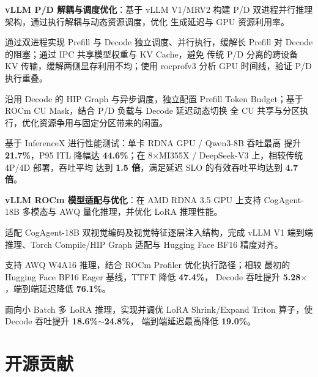 \documentclass{resume}
\let\ResumeOriginalItemize\itemize
\let\ResumeOriginalEndItemize\enditemize
\renewenvironment{itemize}{%
  \ResumeOriginalItemize
  \addtolength{\topsep}{0.2em}%
  \addtolength{\itemsep}{0.2em}%
}{%
  \ResumeOriginalEndItemize
}
\begin{document}
\begin{itemize}
  \item \textbf{vLLM P/D 解耦与调度优化}：基于 vLLM V1/MRV2
  构建 P/D 双进程并行推理架构，通过执行解耦与动态资源调度，优化
  生成延迟与 GPU 资源利用率。
  \begin{itemize}
    \item 通过双进程实现 Prefill 与 Decode 独立调度、并行执行，缓解长
    Prefill 对 Decode 的阻塞；通过 IPC 共享模型权重与 KV Cache，避免
    传统 P/D 分离的跨设备 KV 传输，缓解两侧显存利用不均；使用 rocprofv3
    分析 GPU 时间线，验证 P/D 执行重叠。
    \item 沿用 Decode 的 HIP Graph 与异步调度，独立配置 Prefill Token
    Budget；基于 ROCm CU Mask，结合 P/D 负载与 Decode 延迟动态切换
    全 CU 共享与分区执行，优化资源争用与固定分区带来的闲置。
    \item 基于 InferenceX 进行性能测试：单卡 RDNA GPU / Qwen3-8B 吞吐最高
    提升 \textbf{21.7\%}，P95 ITL 降幅达 \textbf{44.6\%}；在
    8$\times$MI355X / DeepSeek-V3 上，相较传统 4P/4D 部署，吞吐平均
    达到 \textbf{1.5 倍}，满足延迟 SLO 的有效吞吐平均达到 \textbf{4.7 倍}。
  \end{itemize}

  \item \textbf{vLLM ROCm 模型适配与优化}：在 AMD RDNA 3.5 GPU 上支持
  CogAgent-18B 多模态与 AWQ 量化推理，并优化 LoRA 推理性能。
  \begin{itemize}
    \item 适配 CogAgent-18B 双视觉编码及视觉特征逐层注入结构，完成
    vLLM V1 端到端推理、Torch Compile/HIP Graph 适配与 Hugging Face
    BF16 精度对齐。
    \item 支持 AWQ W4A16 推理，结合 ROCm Profiler 优化执行路径；相较
    最初的 Hugging Face BF16 Eager 基线，TTFT 降低 \textbf{47.4\%}，
    Decode 吞吐提升 \textbf{5.28$\times$}，端到端延迟降低 \textbf{76.1\%}。
    \item 面向小 Batch 多 LoRA 推理，实现并调优 LoRA Shrink/Expand
    Triton 算子，使 Decode 吞吐提升 \textbf{18.6\%$\sim$24.8\%}，
    端到端延迟最高降低 \textbf{19.0\%}。
  \end{itemize}
\end{itemize}


\vspace{0.35em}
\section{开源贡献}
\end{document}
